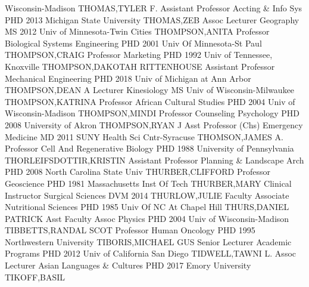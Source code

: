 \documentclass[
]{article}
\begin{document}
Wisconsin-Madison \textbar THOMAS,TYLER F. \textbar{} 
\textbar Assistant Professor \textbar Accting \& Info Sys \textbar PHD
2013 Michigan State University \textbar THOMAS,ZEB \textbar{}
 \textbar Assoc Lecturer \textbar Geography \textbar MS 2012
Univ of Minnesota-Twin Cities \textbar THOMPSON,ANITA \textbar{}
 \textbar Professor \textbar Biological Systems Engineering
\textbar PHD 2001 Univ Of Minnesota-St Paul \textbar THOMPSON,CRAIG
\textbar{}  \textbar Professor \textbar Marketing
\textbar PHD 1992 Univ of Tennessee, Knoxville \textbar THOMPSON,DAKOTAH
RITTENHOUSE \textbar{}  \textbar Assistant Professor
\textbar Mechanical Engineering \textbar PHD 2018 Univ of Michigan at
Ann Arbor \textbar THOMPSON,DEAN A \textbar{} 
\textbar Lecturer \textbar Kinesiology \textbar MS Univ of
Wisconsin-Milwaukee \textbar THOMPSON,KATRINA \textbar{} 
\textbar Professor \textbar African Cultural Studies \textbar PHD 2004
Univ of Wisconsin-Madison \textbar THOMPSON,MINDI \textbar{}
 \textbar Professor \textbar Counseling Psychology
\textbar PHD 2008 University of Akron \textbar THOMPSON,RYAN J
\textbar{}  \textbar Asst Professor (Chs) \textbar Emergency
Medicine \textbar MD 2011 SUNY Health Sci Cntr-Syracuse
\textbar THOMSON,JAMES A. \textbar{}  \textbar Professor
\textbar Cell And Regenerative Biology \textbar PHD 1988 University of
Pennsylvania \textbar THORLEIFSDOTTIR,KRISTIN \textbar{} 
\textbar Assistant Professor \textbar Planning \& Landscape Arch
\textbar PHD 2008 North Carolina State Univ \textbar THURBER,CLIFFORD
\textbar{}  \textbar Professor \textbar Geoscience
\textbar PHD 1981 Massachusetts Inst Of Tech \textbar THURBER,MARY
\textbar{}  \textbar Clinical Instructor \textbar Surgical
Sciences \textbar DVM 2014 \textbar THURLOW,JULIE \textbar{}
 \textbar Faculty Associate \textbar Nutritional Sciences
\textbar PHD 1985 Univ Of NC At Chapel Hill \textbar THURS,DANIEL
PATRICK \textbar{}  \textbar Asst Faculty Assoc
\textbar Physics \textbar PHD 2004 Univ of Wisconsin-Madison
\textbar TIBBETTS,RANDAL SCOT \textbar{}  \textbar Professor
\textbar Human Oncology \textbar PHD 1995 Northwestern University
\textbar TIBORIS,MICHAEL GUS \textbar{}  \textbar Senior
Lecturer \textbar Academic Programs \textbar PHD 2012 Univ of California
San Diego \textbar TIDWELL,TAWNI L. \textbar{} 
\textbar Assoc Lecturer \textbar Asian Languages \& Cultures
\textbar PHD 2017 Emory University \textbar TIKOFF,BASIL \textbar{}
\end{document}
